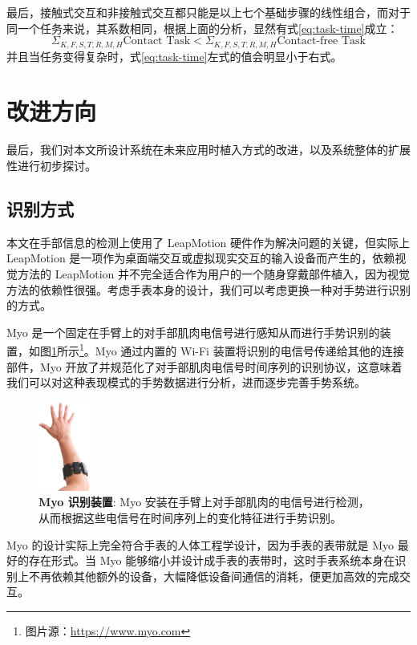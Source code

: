 最后，接触式交互和非接触式交互都只能是以上七个基础步骤的线性组合，而对于同一个任务来说，其系数相同，根据上面的分析，显然有式\ref{eq:task-time}成立：
\begin{equation}
    \label{eq:task-time}
    \Sigma_{K,F,S,T,R,M,H}{\text{Contact Task}} < \Sigma_{K,F,S,T,R,M,H}{\text{Contact-free Task}}
\end{equation}
并且当任务变得复杂时，式\ref{eq:task-time}左式的值会明显小于右式。

\section{改进方向}

最后，我们对本文所设计系统在未来应用时植入方式的改进，以及系统整体的扩展性进行初步探讨。

\subsection{识别方式}

本文在手部信息的检测上使用了 LeapMotion 硬件作为解决问题的关键，但实际上 LeapMotion 是一项作为桌面端交互或虚拟现实交互的输入设备而产生的，依赖视觉方法的 LeapMotion 并不完全适合作为用户的一个随身穿戴部件植入，因为视觉方法的依赖性很强。考虑手表本身的设计，我们可以考虑更换一种对手势进行识别的方式。

Myo \cite{Myo:2016} 是一个固定在手臂上的对手部肌肉电信号进行感知从而进行手势识别的装置，如图\ref{fig:myo}所示\footnote{图片源：\url{https://www.myo.com}}。Myo 通过内置的 Wi-Fi 装置将识别的电信号传递给其他的连接部件，Myo 开放了并规范化了对手部肌肉电信号时间序列的识别协议，这意味着我们可以对这种表现模式的手势数据进行分析，进而逐步完善手势系统。

\begin{figure}[H]
    \kaishu
    \centering
    \includegraphics[width=0.15\textwidth]{figures/myo}
    \caption{\kaishu \textbf{Myo 识别装置}: Myo 安装在手臂上对手部肌肉的电信号进行检测，从而根据这些电信号在时间序列上的变化特征进行手势识别。}
    \label{fig:myo}
\end{figure}

Myo 的设计实际上完全符合手表的人体工程学设计，因为手表的表带就是 Myo 最好的存在形式。当 Myo 能够缩小并设计成手表的表带时，这时手表系统本身在识别上不再依赖其他额外的设备，大幅降低设备间通信的消耗，便更加高效的完成交互。

